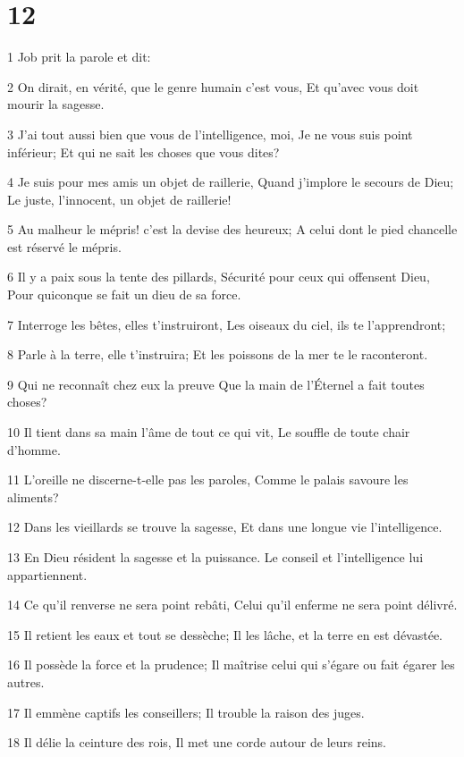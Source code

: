 \chapter{12}

\par 1 Job prit la parole et dit:
\par 2 On dirait, en vérité, que le genre humain c'est vous, Et qu'avec vous doit mourir la sagesse.
\par 3 J'ai tout aussi bien que vous de l'intelligence, moi, Je ne vous suis point inférieur; Et qui ne sait les choses que vous dites?
\par 4 Je suis pour mes amis un objet de raillerie, Quand j'implore le secours de Dieu; Le juste, l'innocent, un objet de raillerie!
\par 5 Au malheur le mépris! c'est la devise des heureux; A celui dont le pied chancelle est réservé le mépris.
\par 6 Il y a paix sous la tente des pillards, Sécurité pour ceux qui offensent Dieu, Pour quiconque se fait un dieu de sa force.
\par 7 Interroge les bêtes, elles t'instruiront, Les oiseaux du ciel, ils te l'apprendront;
\par 8 Parle à la terre, elle t'instruira; Et les poissons de la mer te le raconteront.
\par 9 Qui ne reconnaît chez eux la preuve Que la main de l'Éternel a fait toutes choses?
\par 10 Il tient dans sa main l'âme de tout ce qui vit, Le souffle de toute chair d'homme.
\par 11 L'oreille ne discerne-t-elle pas les paroles, Comme le palais savoure les aliments?
\par 12 Dans les vieillards se trouve la sagesse, Et dans une longue vie l'intelligence.
\par 13 En Dieu résident la sagesse et la puissance. Le conseil et l'intelligence lui appartiennent.
\par 14 Ce qu'il renverse ne sera point rebâti, Celui qu'il enferme ne sera point délivré.
\par 15 Il retient les eaux et tout se dessèche; Il les lâche, et la terre en est dévastée.
\par 16 Il possède la force et la prudence; Il maîtrise celui qui s'égare ou fait égarer les autres.
\par 17 Il emmène captifs les conseillers; Il trouble la raison des juges.
\par 18 Il délie la ceinture des rois, Il met une corde autour de leurs reins.
